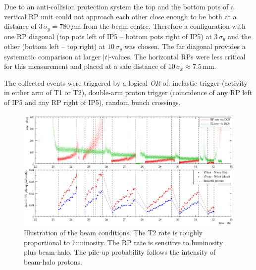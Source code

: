 \documentclass[TOTEM]{cern/cernphprep}
\def\un#1{\,{\rm #1}}
\def\hang{\hangindent=\parindent}
\def\>{\par\vskip\itskip\parindent\itindent\indent\hang\llap{\hbox to3mm{$\bullet$\hss}}}
\def\>E{\par\vskip\itskip\parindent\itindent\indent\hang\llap{\hbox to3mm{\hss}}}
\def\>>{\par\vskip\iitskip\parindent\iitindent\indent\hang\llap{\hbox to\iitindent{\hss--\ }}}
\begin{document}
Due to an anti-collision protection system the top and the bottom pots of a 
vertical RP unit could not approach each other close enough to be both at a 
distance of $3\,\sigma_{y} = 780\,\mu$m from the beam centre. Therefore a 
configuration with one RP diagonal (top pots left of IP5 -- bottom pots right
of IP5) at $3\,\sigma_{y}$ and the other (bottom left -- top right) at 
$10\,\sigma_{y}$ was chosen. The far diagonal provides a systematic comparison
at larger $|t|$-values.
The horizontal RPs were less critical for this measurement and placed at a
safe distance of $10\,\sigma_{x} \approx 7.5$\,mm.

The collected events were triggered by a logical \textit{OR} of: inelastic 
trigger (activity in either arm of T1 or T2), double-arm proton trigger 
(coincidence of any RP left of IP5 and any RP right of IP5), 
random bunch crossings.

\begin{figure}
\begin{center}
\includegraphics[width=16cm]{fig/overview.pdf}
\vskip-3mm
\caption{Illustration of the beam conditions. The T2 rate is roughly proportional to luminosity. The RP rate is sensitive to luminosity plus beam-halo. The pile-up probability follows the intensity of beam-halo protons.}
\label{fig:overview}
\end{center}
\end{figure}
\end{document}
